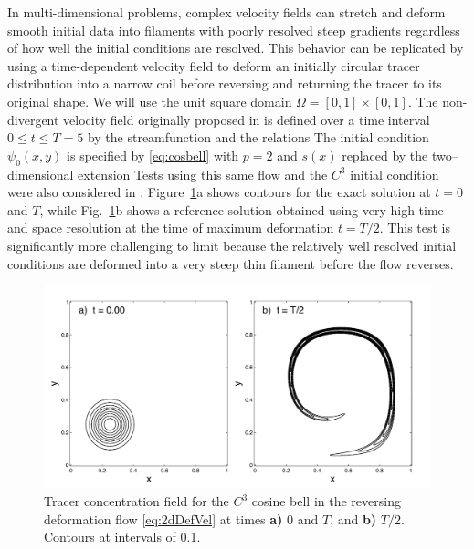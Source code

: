 \documentclass{ametsoc}
\begin{document}
In multi-dimensional problems, complex velocity fields can stretch and deform smooth initial data into filaments with poorly resolved steep gradients regardless of how well the initial conditions are resolved.  This behavior can be replicated by using a time-dependent velocity field to deform an initially circular tracer distribution into a narrow coil before reversing and returning the tracer to its original shape. We will use the unit square domain  $\Omega = [0,1] \times [0,1]$. The non-divergent velocity field originally proposed in \cite{LeVeque1996} is defined over a time interval $0 \leq t \leq T=5$ by the streamfunction
and the relations
The initial condition $\psi_0(x,y)$ is specified by \eqref{eq:cosbell} with $p=2$ and $s(x)$ replaced by the two--dimensional extension
Tests using this same flow and the $C^3$ initial condition were also considered in \cite{ullrich2014}. Figure~\ref{fig:cosbellExact}a shows contours for the exact solution at $t=0$ and $T$, while Fig.~\ref{fig:cosbellExact}b shows a reference solution obtained using very high time and space resolution at the time of maximum deformation $t=T/2$. This test is significantly more challenging to limit because the relatively well resolved initial conditions are deformed into a very steep thin filament before the flow reverses. 

\begin{figure}
\includegraphics[width=0.8 \textwidth]{figs/2d/defCosbellExact.pdf}
\caption{Tracer concentration field for the $C^3$ cosine bell in the reversing deformation flow \eqref{eq:2dDefVel} at times \textbf{a)} 0 and $T$, and  \textbf{b)} $T/2$. Contours at intervals of 0.1.}
\label{fig:cosbellExact}
\end{figure}
\end{document}
